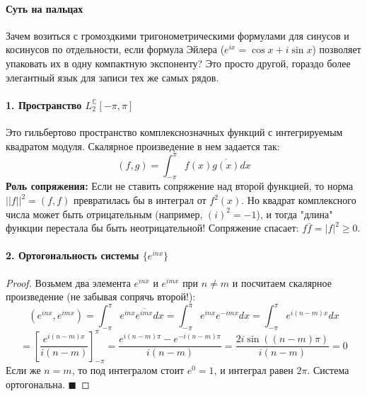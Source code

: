 \paragraph{Суть на пальцах}
Зачем возиться с громоздкими тригонометрическими формулами для синусов и косинусов по отдельности, если формула Эйлера ($e^{ix} = \cos x + i \sin x$) позволяет упаковать их в одну компактную экспоненту? Это просто другой, гораздо более элегантный язык для записи тех же самых рядов.

\paragraph{1. Пространство $L_{2}^{\mathbb{C}}[-\pi,\pi]$}
Это гильбертово пространство комплекснозначных функций с интегрируемым квадратом модуля. Скалярное произведение в нем задается так:
$$ (f, g) = \int_{-\pi}^\pi f(x) \overline{g(x)} dx $$
\textbf{Роль сопряжения:} Если не ставить сопряжение над второй функцией, то норма $||f||^2 = (f,f)$ превратилась бы в интеграл от $f^2(x)$. Но квадрат комплексного числа может быть отрицательным (например, $(i)^2 = -1$), и тогда "длина" функции перестала бы быть неотрицательной! Сопряжение спасает: $f \overline{f} = |f|^2 \ge 0$.

\paragraph{2. Ортогональность системы $\{e^{inx}\}$}
\begin{proof}
Возьмем два элемента $e^{inx}$ и $e^{imx}$ при $n \ne m$ и посчитаем скалярное произведение (не забывая сопрячь второй!):
$$ (e^{inx}, e^{imx}) = \int_{-\pi}^\pi e^{inx} \overline{e^{imx}} dx = \int_{-\pi}^\pi e^{inx} e^{-imx} dx = \int_{-\pi}^\pi e^{i(n-m)x} dx $$
$$ = \left[ \frac{e^{i(n-m)x}}{i(n-m)} \right]_{-\pi}^\pi = \frac{e^{i(n-m)\pi} - e^{-i(n-m)\pi}}{i(n-m)} = \frac{2i \sin((n-m)\pi)}{i(n-m)} = 0 $$
Если же $n=m$, то под интегралом стоит $e^0 = 1$, и интеграл равен $2\pi$. Система ортогональна. $\blacksquare$
\end{proof}


